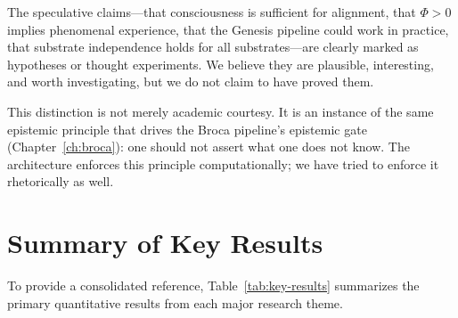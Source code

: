 \documentclass[12pt]{book}
\begin{document}
The speculative claims---that consciousness is sufficient for alignment, that $\Phi > 0$ implies phenomenal experience, that the Genesis pipeline could work in practice, that substrate independence holds for all substrates---are clearly marked as hypotheses or thought experiments. We believe they are plausible, interesting, and worth investigating, but we do not claim to have proved them.

This distinction is not merely academic courtesy. It is an instance of the same epistemic principle that drives the Broca pipeline's epistemic gate (Chapter~\ref{ch:broca}): one should not assert what one does not know. The architecture enforces this principle computationally; we have tried to enforce it rhetorically as well.

\section{Summary of Key Results}

To provide a consolidated reference, Table~\ref{tab:key-results} summarizes the primary quantitative results from each major research theme.
\end{document}
